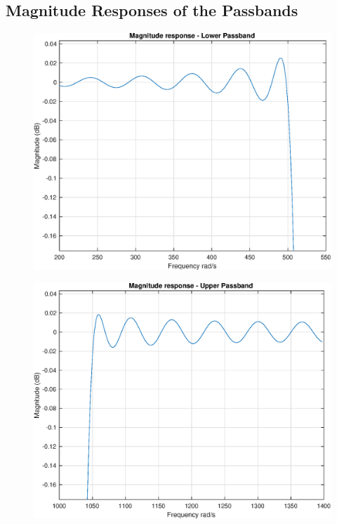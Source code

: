 \documentclass[11pt]{article}
\begin{document}
\subsection{Magnitude Responses of the Passbands}
\begin{figure}[H]
    \centering
    \begin{minipage}{.5\textwidth}
        \centering
        \includegraphics[width=1\linewidth]{upassband.eps}
        \label{fig:test2}
      \end{minipage}%
	\begin{minipage}{.5\textwidth}
	  \centering
	  \includegraphics[width=1\linewidth]{lpassband.eps}
	  \label{fig:test1}
	\end{minipage}
\end{figure}
\end{document}
